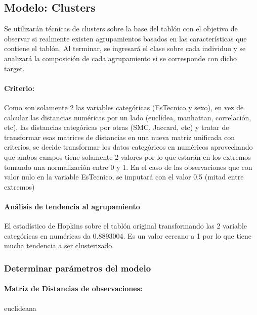 \subsection{Modelo: Clusters}

Se utilizarán técnicas de clusters sobre la base del tablón con el objetivo de observar si realmente existen agrupamientos basados en las características que contiene el tablón. Al terminar, se ingresará el clase sobre cada individuo y se analizará la composición de cada agrupamiento si se corresponde con dicho target. \\

\paragraph{\textbf{Criterio:}}

Como son solamente 2 las variables categóricas (EsTecnico y
sexo), en vez de calcular las distancias numéricas por un lado
(euclídea, manhattan, correlación, etc), las distancias categóricas por
otras (SMC, Jaccard, etc) y tratar de transformar esas matrices de
distancias en una nueva matriz unificada con criterios, se decide
transformar los datos categóricos en numéricos aprovechando que ambos
campos tiene solamente 2 valores por lo que estarán en los extremos
tomando una normalización entre 0 y 1. En el caso de las observaciones
que con valor nulo en la variable EsTecnico, se imputará con el valor
0.5 (mitad entre extremos)

\paragraph{Análisis de tendencia al agrupamiento}

El estadístico de Hopkins sobre el tablón original transformando las 2
variable categóricas en numéricas da 0.8893004. Es un valor cercano a 1
por lo que tiene mucha tendencia a ser clusterizado.

\subsubsection{\textbf{Determinar parámetros del modelo}}

\paragraph{\textbf{Matriz de Distancias de observaciones:}} euclideana

